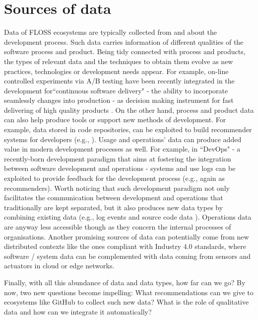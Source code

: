 \section{Sources of data}
Data of FLOSS ecosystems are typically collected from and about 
the development process. Such data carries information of different 
qualities of the software process and product. Being tidy connected 
with process and products, the types of relevant data and the techniques 
to obtain them  evolve as new practices, technologies or development 
needs appear. For example, on-line controlled experiments via A/B testing  
have been recently integrated in the development for``continuous software delivery" 
- the ability to incorporate seamlessly  changes into production - 
as decision making instrument for fast delivering of high quality products \cite{KevicEtAl2017}. 
On the other hand, process and product data can also help produce tools or 
support new methods of development. 
For example, data stored in code repositories, can be exploited 
to build recommender systems for developers (e.g., \cite{VillaroelEtAl2016}).  
Usage and operations' data can produce added value in modern 
development processes as well.  For example,  in ``DevOps" 
- a recently-born development paradigm that aims at fostering 
the integration between software development and operations 
- systems and use logs can be exploited to provide feedback for the 
development process (e.g., again as recommenders).
Worth noticing that such development paradigm not only facilitates 
the communication between development and operations that
traditionally are kept separated, but it also produces new data types 
by combining existing data (e.g., log events and source code data
 \cite{MeiNagappanPhDThesis}). Operations data are anyway less accessible though 
 as they concern the internal processes of organisations.  
Another promising  sources of data can potentially come from 
new distributed contexts like the ones compliant with Industry 4.0 standards, 
where software / system data can be complemented with data coming 
from sensors and actuators in cloud or edge networks.   

Finally, with all this abundance of data and data types, how far can we go? 
By now, two new questions become impelling: What recommendations 
can we give to  ecosystems like GitHub to collect such new data? 
What is the role of qualitative data and how can we integrate it automatically?

